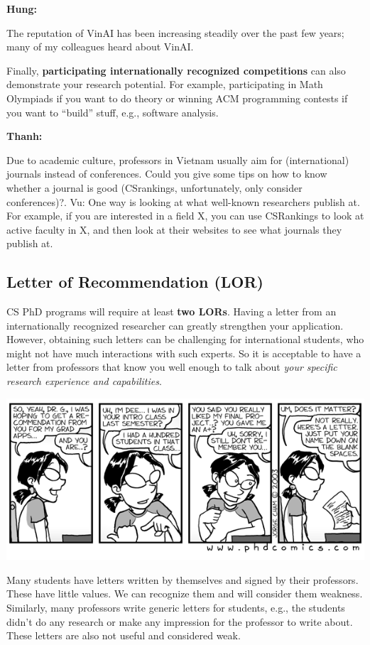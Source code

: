 \documentclass[11pt]{article}
\newenvironment{commentbox}[1][]{
\small
    \begin{cbox}
    \textbf{#1} 
 }{
   \end{cbox}
}
\begin{document}
\begin{commentbox}[Hung:]
The reputation of VinAI has been increasing steadily over the past few years; many of my colleagues heard about VinAI.
\end{commentbox}

Finally, \textbf{participating internationally recognized competitions} can also demonstrate your research potential.
For example, participating in Math Olympiads if you want to do theory or  winning ACM programming contests if you want to ``build'' stuff, e.g., software analysis.

\begin{commentbox}[Thanh:]
Due to academic culture, professors in Vietnam usually aim for (international) journals instead of conferences. Could you give some tips on how to know whether a journal is good (CSrankings, unfortunately, only consider conferences)?.
\tcblower
Vu: One way is looking at what well-known researchers publish at. For example, if you are interested in a field X, you can use CSRankings to look at active faculty in X, and then look at their websites to see what journals they publish at.
\end{commentbox}

\subsection{Letter of Recommendation (LOR)}\label{sec:lor}

CS PhD programs will require at least \textbf{two LORs}. Having a letter from an internationally recognized researcher can greatly strengthen your application. However, obtaining such letters
can be challenging for international students, who might not have much interactions with such experts. So it is acceptable to have a letter from professors that know you well enough to talk about \emph{your specific research experience and capabilities}.

\begin{center}
\includegraphics[width=0.6\linewidth]{c6.png}
\end{center}

Many students have letters written by themselves and signed by their professors. These have little
values. We can recognize them and will consider them weakness.
Similarly, many professors write generic letters for students, e.g., the students didn't do any
research or make any impression for the professor to write about. These letters are also not useful and considered weak.
\end{document}

